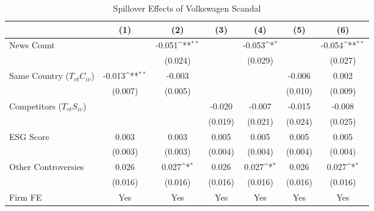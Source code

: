 \begin{table}[htbp]\centering
\def\sym#1{\ifmmode^{#1}\else\(^{#1}\)\fi}
\caption{Spillover Effects of Volkswagen Scandal}
\begin{tabular}{l*{6}{c}}
\toprule
                    &\multicolumn{1}{c}{(1)}         &\multicolumn{1}{c}{(2)}         &\multicolumn{1}{c}{(3)}         &\multicolumn{1}{c}{(4)}         &\multicolumn{1}{c}{(5)}         &\multicolumn{1}{c}{(6)}         \\
\midrule
News Count          &                     &      -0.051\sym{**} &                     &      -0.053\sym{*}  &                     &      -0.054\sym{**} \\
                    &                     &     (0.024)         &                     &     (0.029)         &                     &     (0.027)         \\
\addlinespace
Same Country ($ T_{vt} C_{iv}$)&      -0.013\sym{**} &      -0.003         &                     &                     &      -0.006         &       0.002         \\
                    &     (0.007)         &     (0.005)         &                     &                     &     (0.010)         &     (0.009)         \\
\addlinespace
Competitors ($ T_{vt} S_{iv}$)&                     &                     &      -0.020         &      -0.007         &      -0.015         &      -0.008         \\
                    &                     &                     &     (0.019)         &     (0.021)         &     (0.024)         &     (0.025)         \\
\addlinespace
ESG Score           &       0.003         &       0.003         &       0.005         &       0.005         &       0.005         &       0.005         \\
                    &     (0.003)         &     (0.003)         &     (0.004)         &     (0.004)         &     (0.004)         &     (0.004)         \\
\addlinespace
Other Controversies &       0.026         &       0.027\sym{*}  &       0.026         &       0.027\sym{*}  &       0.026         &       0.027\sym{*}  \\
                    &     (0.016)         &     (0.016)         &     (0.016)         &     (0.016)         &     (0.016)         &     (0.016)         \\
\midrule
Firm FE             &         Yes         &         Yes         &         Yes         &         Yes         &         Yes         &         Yes         \\

\end{tabular}
\end{table}
